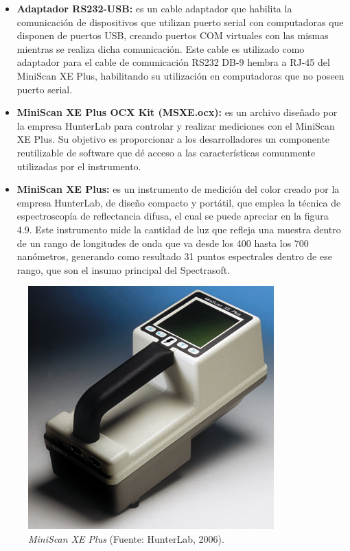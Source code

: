 		\begin{itemize}
			
			\item \textbf{Adaptador RS232-USB:} es un cable adaptador que habilita la comunicaci\'{o}n de dispositivos que utilizan puerto serial con computadoras que disponen de puertos USB, creando puertos COM virtuales con las mismas mientras se realiza dicha comunicaci\'{o}n. Este cable es utilizado como adaptador para el cable de comunicaci\'{o}n RS232 DB-9 hembra a RJ-45 del MiniScan XE Plus, habilitando su utilizaci\'{o}n en computadoras que no poseen puerto serial.
			
			\item \textbf{MiniScan XE Plus OCX Kit (MSXE.ocx):} es un archivo dise\~{n}ado por la empresa HunterLab para controlar y realizar mediciones con el MiniScan XE Plus. Su objetivo es proporcionar a los desarrolladores un componente reutilizable de software que d\'{e} acceso a las caracter\'{i}sticas comunmente utilizadas por el instrumento.
			
			\item \textbf{MiniScan XE Plus:} es un instrumento de medici\'{o}n del color creado por la empresa HunterLab, de dise\~{n}o compacto y port\'{a}til, que emplea la t\'{e}cnica de espectroscop\'{i}a de reflectancia difusa, el cual se puede apreciar en la figura 4.9. Este instrumento mide la cantidad de luz que refleja una muestra dentro de un rango de longitudes de onda que va desde los 400 hasta los 700 nan\'{o}metros, generando como resultado 31 puntos espectrales dentro de ese rango, que son el insumo principal del Spectrasoft.
			
		\end{itemize}
		
	\begin{figure}[H]
		\centering
		\includegraphics[scale=1]{img/MiniScanXEPlus.png}
			\caption[MiniScan XE Plus]{\textit{MiniScan XE Plus} (Fuente: HunterLab, 2006).}
	\end{figure}


